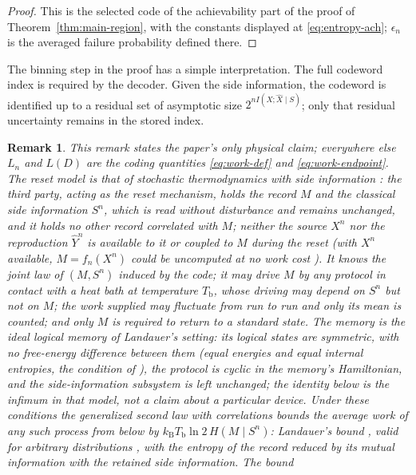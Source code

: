 \documentclass[11pt,onecolumn]{IEEEtran}
\newtheorem{remark}[theorem]{Remark}
\newcommand{\hX}{\widehat{X}}
\newcommand{\hY}{\widehat{Y}}
\newcommand{\kb}{k_{\mathrm{B}}}
\begin{document}
\begin{proof}
This is the selected code of the achievability part of the proof of
Theorem~\ref{thm:main-region}, with the constants displayed at
\eqref{eq:entropy-ach}; $\epsilon_n$ is the averaged failure
probability defined there.
\end{proof}

The binning step in the proof has a simple interpretation. The full codeword
index is required by the decoder. Given the side information, the codeword
is identified up to a residual set of asymptotic size $2^{nI(X;\hX\mid S)}$; only
that residual uncertainty remains in the stored index.

\begin{remark}\label{rem:thermo}
This remark states the paper's only physical claim; everywhere else
$L_n$ and $L(D)$ are the coding quantities \eqref{eq:work-def} and
\eqref{eq:work-endpoint}. The reset model is that of stochastic
thermodynamics with side information \cite{sagawa2012,parrondo2015}: the
third party, acting as the reset mechanism, holds the record $M$ and the
classical side information $S^n$, which is read without disturbance and
remains unchanged, and it holds no other record correlated with $M$;
neither the source $X^n$ nor the reproduction $\hY^n$ is available to it
or coupled to $M$ during the reset (with $X^n$ available, $M=f_n(X^n)$
could be uncomputed at no work cost \cite{bennett1973}). It knows the
joint law of $(M,S^n)$ induced by the code; it may drive $M$ by any
protocol in contact with a heat bath at temperature $T_{\mathrm b}$,
whose driving may depend on $S^n$ but not on $M$; the work supplied may
fluctuate from run to run and only its mean is counted; and only $M$ is
required to return to a standard state. The memory is the ideal logical
memory of Landauer's setting: its logical states are symmetric, with no
free-energy difference between them (equal energies and equal internal
entropies, the condition of \cite{sagawa2009}), the protocol is cyclic in
the memory's Hamiltonian, and the side-information subsystem is left
unchanged; the identity below is the infimum in that model, not a claim
about a particular device. Under these conditions the generalized second
law with correlations \cite{sagawa2012,parrondo2015} bounds the average
work of any such process from below by $\kb T_{\mathrm b}\ln2\,H(M\mid
S^n)$: Landauer's bound \cite{landauer1961}, valid for arbitrary
distributions \cite{esposito2011}, with the entropy of the record reduced
by its mutual information with the retained side information. The bound

\end{remark}
\end{document}
